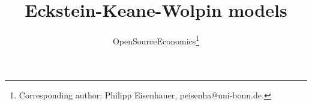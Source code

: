 
\title{Eckstein-Keane-Wolpin models}
\author{OpenSourceEconomics\thanks{Corresponding author: Philipp Eisenhauer, peisenha@uni-bonn.de.}}
\date{}

